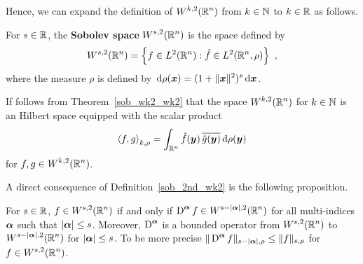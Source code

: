 Hence, we can expand the definition of
$\displaystyle W^{k,2}(\mathbb{R}^n)$ from $k \in\mathbb{N}$ to $k\in \mathbb{R}$ as follows.

\begin{defn} \label{sob_2nd_wk2}
For $s\in \mathbb{R}$, the
{\bfseries Sobolev space}
$\displaystyle W^{s,2}(\mathbb{R}^n)$ is the space defined by
\[
W^{s,2}(\mathbb{R}^n) = \left\{ f \in L^2(\mathbb{R}^n) : \hat{f} \in
  L^2(\mathbb{R}^n,\rho) \right\} \ ,
\]
where the measure $\rho$ is defined by
$\displaystyle \,\mathrm{d}{\rho({\bm{x}})} = (1+\|{\bm{x}}\|^2)^s\,\mathrm{d}{{\bm{x}}}$.
\end{defn}

If follows from Theorem~\ref{sob_wk2_wk2} that the space
$\displaystyle W^{k,2}(\mathbb{R}^n)$ for $k \in \mathbb{N}$ is an Hilbert space
equipped with the scalar product
\begin{equation} \label{sob_sp_wkmu}
\left\langle{f} , {g}\right\rangle_{k,\rho} = \int_{\mathbb{R}^n} \hat{f}({\bm{y}})\, \overline{\hat{g}({\bm{y}})}
\,\mathrm{d}{\rho({\bm{y}})}
\end{equation}
for $\displaystyle f,g \in W^{k,2}(\mathbb{R}^n)$.

A direct consequence of Definition~\ref{sob_2nd_wk2} is the following
proposition.

\begin{prop} \label{sob_DinDm}
For $s\in \mathbb{R}$, $\displaystyle f\in W^{s,2}(\mathbb{R}^n)$ if and only if
$\displaystyle \operatorname{D}^{{\bm{\alpha}}} f \in W^{s-|{\bm{\alpha}}|,2}(\mathbb{R}^n)$ for all
multi-indices ${\bm{\alpha}}$ such that $|{\bm{\alpha}}|\leq s$.  Moreover,
$\displaystyle \operatorname{D}^{{\bm{\alpha}}}$ is a bounded operator
from $\displaystyle W^{s,2}(\mathbb{R}^n)$ to
$\displaystyle W^{s-|{\bm{\alpha}}|,2}(\mathbb{R}^n)$ for $|{\bm{\alpha}}|\leq s$.  To be
more precise
$\displaystyle \|\operatorname{D}^{{\bm{\alpha}}} f\|_{s-|{\bm{\alpha}}|,\rho}
\leq \|f\|_{s,\rho}$ for $\displaystyle f\in W^{s,2}(\mathbb{R}^n)$.
\end{prop}

